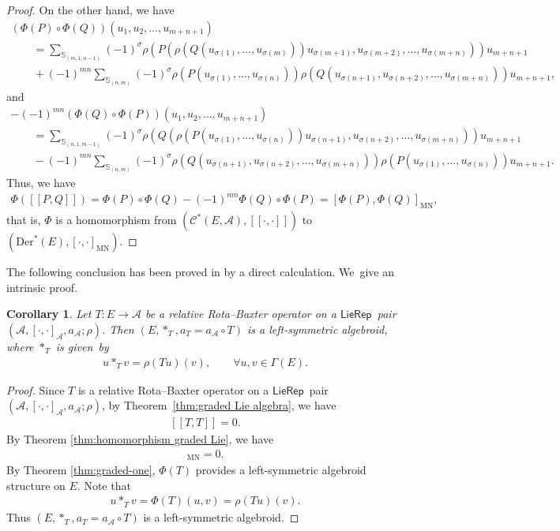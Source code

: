\documentclass[10pt,a4paper]{amsart}
\numberwithin{equation}{section}
\newtheorem{cor}[thm]{Corollary}
\newcommand{\huaA}{\mathcal{A}}
\newcommand{\huaC}{\mathcal{C}}
\newcommand{\Courant}[1]{\left[\!\left[ #1\right]\!\right]}
\newcommand{\Der}{\mathrm{Der}}
\newcommand{\MN}{\mathrm{MN}}
\newcommand{\LP}{$\mathsf{LieRep}$~}
\begin{document}
\begin{proof}
On the other hand, we have
\begin{gather*}
(\Phi(P)\circ\Phi(Q))(u_1,u_2,\dots,u_{m+n+1})
\\ \qquad
{}=\!\!\sum_{\mathbb{S}_{(m,1,n-1)}}\!\!(-1)^{\sigma}\rho(P(\rho(Q(u_{\sigma(1)},\dots,u_{\sigma(m)})) u_{\sigma(m+1)},u_{\sigma(m+2)},\dots,u_{\sigma(m+n)}))u_{m+n+1}
\\ \qquad
{}+(-1)^{mn}\!\!\sum_{\mathbb{S}_{(n,m)}}\!\!\!(-1)^{\sigma}\rho(P(u_{\sigma(1)},\dots,u_{\sigma(n)})) \rho(Q(u_{\sigma(n+1)},u_{\sigma(n+2)},\dots,u_{\sigma(m+n)}))u_{m+n+1},
\end{gather*}
and
\begin{gather*}
-(-1)^{mn}(\Phi(Q)\circ\Phi(P))(u_1,u_2,\dots,u_{m+n+1})
\\ \qquad
{}=\sum_{\mathbb{S}_{(n,1,m-1)}}(-1)^{\sigma}\rho(Q(\rho(P(u_{\sigma(1)},\dots,u_{\sigma(n)})) u_{\sigma(n+1)},u_{\sigma(n+2)},\dots,u_{\sigma(m+n)}))u_{m+n+1}
\\ \qquad
{}-(-1)^{mn}\!\!\sum_{\mathbb{S}_{(n,m)}}\!\!(-1)^{\sigma}
\rho(Q(u_{\sigma(n+1)},u_{\sigma(n+2)},\dots,u_{\sigma(m+n)})) \rho(P(u_{\sigma(1)},\dots,u_{\sigma(n)}))u_{m+n+1}.
\end{gather*}
Thus, we have
\begin{gather*}
\Phi(\Courant{P,Q})=\Phi(P)\circ\Phi(Q)-(-1)^{mn}\Phi(Q)\circ\Phi(P)=[\Phi(P),\Phi(Q)]_\MN,
\end{gather*}
that is, $\Phi$ is a homomorphism from $(\huaC^*(E,\huaA),\Courant{\cdot,\cdot})$ to $(\Der^*(E),[\cdot,\cdot]_{\MN})$.
\end{proof}



The following conclusion has been proved in \cite{LiuShengBaiChen} by a direct calculation. We~give an intrinsic proof.
\begin{cor}\label{cor:construction left-symmetrci algebroid}
{\sloppy
Let $T\colon E\longrightarrow \huaA$ be a relative Rota--Baxter operator on a \LP pair $(\huaA,[\cdot,\cdot]_\huaA,a_\huaA;\rho)$. Then $(E, \ast_{T}, a_T=a_\huaA\circ T)$ is a left-symmetric algebroid, where $\ast_{T}$ is given~by
\begin{gather*}
u\ast_{T}v=\rho(Tu)(v),\qquad \forall u,v\in\Gamma(E).
\end{gather*}}
\end{cor}

\begin{proof}
 Since $T$ is a relative Rota--Baxter operator on a \LP pair $(\huaA,[\cdot,\cdot]_\huaA,a_\huaA;\rho)$, by Theo\-rem~\ref{thm:graded Lie algebra}, we have
\begin{gather*}
\Courant{T,T}=0.
\end{gather*}
By Theorem \ref{thm:homomorphism graded Lie}, we have
\begin{gather*}
[\Phi(T),\Phi(T)]_{\MN}=0.
\end{gather*}
By Theorem \ref{thm:graded-one}, $\Phi(T)$ provides a left-symmetric algebroid structure on $E$. Note that
\begin{gather*}
u\ast_{T}v=\Phi(T)(u,v)=\rho(Tu)(v).
\end{gather*}
 Thus $(E, \ast_{T}, a_T=a_\huaA\circ T)$ is a left-symmetric algebroid.
\end{proof}
\end{document}
